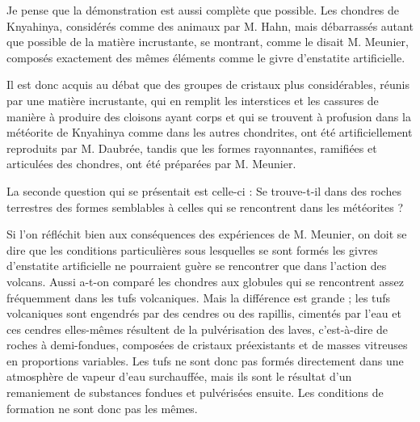 \documentclass[a4paper, 12pt, oneside, french]{article}
\begin{document}
Je pense que la démonstration est aussi complète que possible. Les chondres de Knyahinya, considérés comme des animaux par M. Hahn, mais débarrassés autant que possible de la matière incrustante, se montrant, comme le disait M. Meunier, composés exactement des mêmes éléments comme le givre d'enstatite artificielle.

Il est donc acquis au débat que des groupes de cristaux plus considérables, réunis par une matière incrustante, qui en remplit les interstices et les cassures de manière à produire des cloisons ayant corps et qui se trouvent à profusion dans la météorite de Knyahinya comme dans les autres chondrites, ont été artificiellement reproduits par M. Daubrée, tandis que les formes rayonnantes, ramifiées et articulées des chondres, ont été préparées par M. Meunier.

La seconde question qui se présentait est celle-ci : Se trouve-t-il dans des roches terrestres des formes semblables à celles qui se rencontrent dans les météorites ?

Si l'on réfléchit bien aux conséquences des expériences de M. Meunier, on doit se dire que les conditions particulières sous lesquelles se sont formés les givres d'enstatite artificielle ne pourraient guère se rencontrer que dans l'action des volcans. Aussi a-t-on comparé les chondres aux globules qui se rencontrent assez fréquemment dans les tufs volcaniques. Mais la différence est grande ; les tufs volcaniques sont engendrés par des cendres ou des rapillis, cimentés par l'eau et ces cendres elles-mêmes résultent de la pulvérisation des laves, c'est-à-dire de roches à demi-fondues, composées de cristaux préexistants et de masses vitreuses en proportions variables. Les tufs ne sont donc pas formés directement dans une atmosphère de vapeur d'eau surchauffée, mais ils sont le résultat d'un remaniement de substances fondues et pulvérisées ensuite. Les conditions de formation ne sont donc pas les mêmes.
\end{document}
